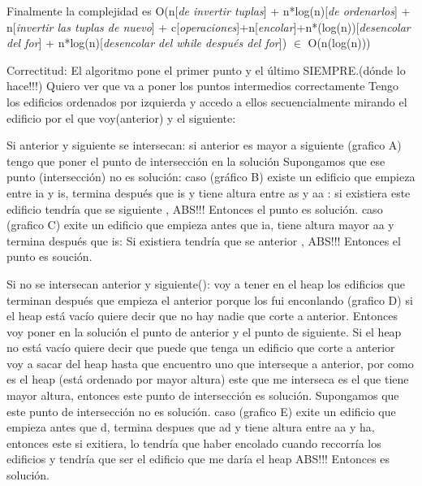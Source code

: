\documentclass{article}
\begin{document}
Finalmente la complejidad es O(n[\textit{de invertir tuplas}] + n*log(n)[\textit{de ordenarlos}] + n[\textit{invertir las tuplas de nuevo}] + c[\textit{operaciones}]+n[\textit{encolar}]+n*(log(n))[\textit{desencolar del for}] + n*log(n)[\textit{desencolar del while después del for}]) $\in$ O(n(log(n))) \newline
\color{red}{**} \color{black}
\newpage



{\noindent \Huge Correctitud:}
\newline \newline
El algoritmo pone el primer punto y el último SIEMPRE.(dónde lo hace!!!)
Quiero ver que va a poner los puntos intermedios correctamente
Tengo los edificios ordenados por izquierda y accedo a ellos secuencialmente mirando el edificio por el que voy(anterior) y el siguiente:

Si anterior y siguiente se intersecan:\newline
	si anterior es mayor a siguiente (grafico A)\newline
		tengo que poner el punto de intersección en la solución\newline
		Supongamos que ese punto (intersección) no es solución:\newline
			caso (gráfico B) existe un edificio que empieza entre ia y is, termina después que is y tiene altura entre as y aa :\newline
			si existiera este edificio tendría que se siguiente , ABS!!!\newline
			Entonces el punto es solución.\newline
			caso (grafico C) exite un edificio que empieza antes que ia, tiene altura mayor aa y termina después que is:\newline
			Si existiera tendría que se anterior , ABS!!!\newline
			Entonces el punto es soución.\newline

Si no se intersecan anterior y siguiente():\newline
	voy a tener en el heap los edificios que terminan después que empieza el anterior porque los fui enconlando (grafico D)
	si el heap está vacío quiere decir que no hay nadie que corte a anterior. \newline
		Entonces voy poner en la solución el punto de anterior y el punto de siguiente.\newline
	Si el heap no está vacío quiere decir que puede que tenga un edificio que corte a anterior 
		voy a sacar del heap hasta que encuentro uno que interseque a anterior, por como es el heap (está ordenado por mayor altura) este que me interseca es el que tiene mayor altura, entonces este punto
		de intersección es solución.\newline
		Supongamos que este punto de intersección no es solución.\newline
		caso (grafico E) exite un edificio que empieza antes que d, termina despues que ad y tiene altura entre aa y ha, entonces este si exitiera, lo tendría que haber encolado cuando reccorría los edificios y tendría que ser el edificio que me daría el heap ABS!!!\newline
		Entonces es solución.\newline
\end{document}
